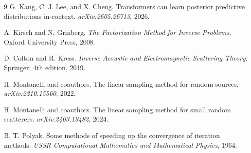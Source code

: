 \documentclass[10pt]{article}
\begin{document}
\begin{thebibliography}{9}
G. Kang, C. J. Lee, and X. Cheng.
\newblock Transformers can learn posterior predictive distributions in-context.
\newblock \emph{arXiv:2605.26713}, 2026.

A. Kirsch and N. Grinberg.
\newblock \emph{The Factorization Method for Inverse Problems}.
\newblock Oxford University Press, 2008.

D. Colton and R. Kress.
\newblock \emph{Inverse Acoustic and Electromagnetic Scattering Theory}.
\newblock Springer, 4th edition, 2019.

H. Montanelli and coauthors.
\newblock The linear sampling method for random sources.
\newblock \emph{arXiv:2210.15560}, 2022.

H. Montanelli and coauthors.
\newblock The linear sampling method for small random scatterers.
\newblock \emph{arXiv:2403.19482}, 2024.

B. T. Polyak.
\newblock Some methods of speeding up the convergence of iteration methods.
\newblock \emph{USSR Computational Mathematics and Mathematical Physics}, 1964.
\end{thebibliography}
\end{document}
